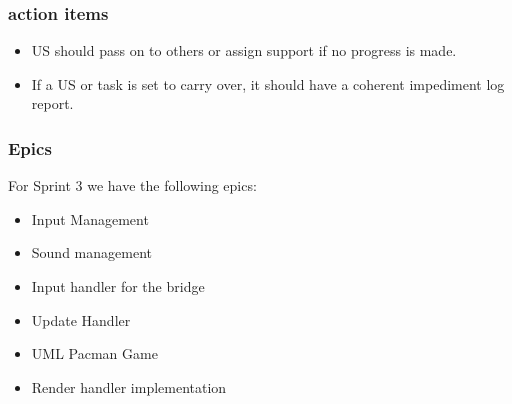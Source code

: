 \subsubsection{action items}

\begin{itemize}
    \item US should pass on to others or assign support if no progress is made.
    \item If a US or task is set to carry over, it should have a coherent impediment log report.
\end{itemize}

\subsubsection{Epics}

For Sprint 3 we have the following epics:

\begin{itemize}
    \item Input Management
    \item Sound management
    \item Input handler for the bridge
    \item Update Handler
    \item UML Pacman Game
    \item Render handler implementation 
\end{itemize}